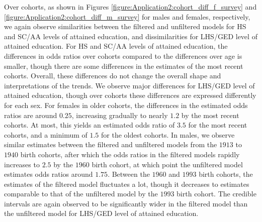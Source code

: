 \vspace{-0.2cm}
Over cohorts, as shown in Figures \ref{figure:Application2:cohort_diff_f_survey} and \ref{figure:Application2:cohort_diff_m_survey} for males and females, respectively, we again observe similarities between the filtered and unfiltered models for HS and SC/AA levels of attained education, and dissimilarities for LHS/GED level of attained education. For HS and SC/AA levels of attained education, the differences in odds ratios over cohorts compared to the differences over age is smaller, though there are some differences in the estimates of the most recent cohorts. Overall, these differences do not change the overall shape and interpretations of the trends. We observe major differences for LHS/GED level of attained education, though over cohorts these differences are expressed differently for each sex. For females in older cohorts, the differences in the estimated odds ratios are around $0.25$, increasing gradually to nearly $1.2$ by the most recent cohorts. At most, this yields an estimated odds ratio of $3.5$ for the most recent cohorts, and a minimum of $1.5$ for the oldest cohorts. In males, we observe similar estimates between the filtered and unfiltered models from the $1913$ to $1940$ birth cohorts, after which the odds ratios in the filtered models rapidly increases to $2.5$ by the $1960$ birth cohort, at which point the unfiltered model estimates odds ratios around $1.75$. Between the $1960$ and $1993$ birth cohorts, the estimates of the filtered model fluctuates a lot, though it decreases to estimates comparable to that of the unfiltered model by the $1993$ birth cohort. The credible intervals are again observed to be significantly wider in the filtered model than the unfiltered model for LHS/GED level of attained education. 

